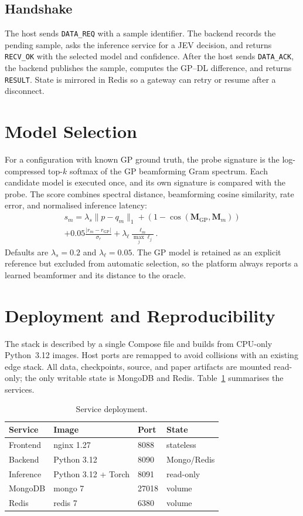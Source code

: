 \documentclass[conference]{IEEEtran}
\begin{document}
\subsection{Handshake}
The host sends \texttt{DATA\_REQ} with a sample identifier. The backend records
the pending sample, asks the inference service for a JEV decision, and returns
\texttt{RECV\_OK} with the selected model and confidence. After the host sends
\texttt{DATA\_ACK}, the backend publishes the sample, computes the GP--DL
difference, and returns \texttt{RESULT}. State is mirrored in Redis so a
gateway can retry or resume after a disconnect.

\section{Model Selection}
For a configuration with known GP ground truth, the probe signature is the
log-compressed top-$k$ softmax of the GP beamforming Gram spectrum. Each
candidate model is executed once, and its own signature is compared with the
probe. The score combines spectral distance, beamforming cosine similarity, rate
error, and normalised inference latency:
\begin{multline}
s_m = \lambda_s \lVert p - q_m \rVert_1
      + (1-\cos(\mathbf{M}_{\mathrm{GP}},\mathbf{M}_m)) \\
      + 0.05\frac{|r_m-r_{\mathrm{GP}}|}{\sigma_r}
      + \lambda_\ell \frac{\ell_m}{\max_j \ell_j}.
\end{multline}
Defaults are $\lambda_s=0.2$ and $\lambda_\ell=0.05$. The GP model is retained
as an explicit reference but excluded from automatic selection, so the platform
always reports a learned beamformer and its distance to the oracle.

\section{Deployment and Reproducibility}
The stack is described by a single Compose file and builds from CPU-only
Python~3.12 images. Host ports are remapped to avoid collisions with an
existing edge stack. All data, checkpoints, source, and paper artifacts are
mounted read-only; the only writable state is MongoDB and Redis. Table~\ref{tab:deploy}
summarises the services.

\begin{table}[t]
\centering
\caption{Service deployment.}
\label{tab:deploy}
\begin{tabular}{@{}llll@{}}
\toprule
Service & Image & Port & State \\
\midrule
Frontend & nginx 1.27 & 8088 & stateless \\
Backend & Python 3.12 & 8090 & Mongo/Redis \\
Inference & Python 3.12 + Torch & 8091 & read-only \\
MongoDB & mongo 7 & 27018 & volume \\
Redis & redis 7 & 6380 & volume \\
\bottomrule
\end{tabular}
\end{table}
\end{document}
